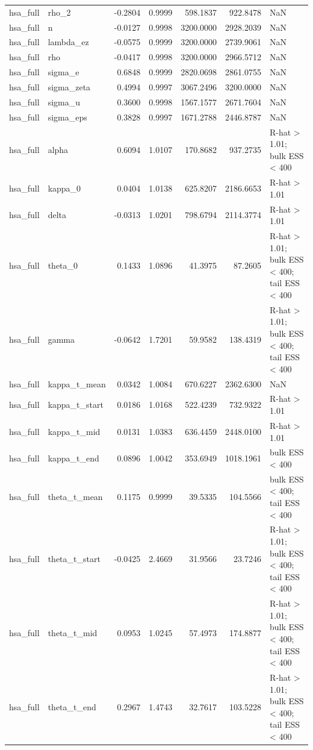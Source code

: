 \begin{tabular}{llrrrrl}
hsa\_full & rho\_2 & -0.2804 & 0.9999 & 598.1837 & 922.8478 & NaN \\
hsa\_full & n & -0.0127 & 0.9998 & 3200.0000 & 2928.2039 & NaN \\
hsa\_full & lambda\_ez & -0.0575 & 0.9999 & 3200.0000 & 2739.9061 & NaN \\
hsa\_full & rho & -0.0417 & 0.9998 & 3200.0000 & 2966.5712 & NaN \\
hsa\_full & sigma\_e & 0.6848 & 0.9999 & 2820.0698 & 2861.0755 & NaN \\
hsa\_full & sigma\_zeta & 0.4994 & 0.9997 & 3067.2496 & 3200.0000 & NaN \\
hsa\_full & sigma\_u & 0.3600 & 0.9998 & 1567.1577 & 2671.7604 & NaN \\
hsa\_full & sigma\_eps & 0.3828 & 0.9997 & 1671.2788 & 2446.8787 & NaN \\
hsa\_full & alpha & 0.6094 & 1.0107 & 170.8682 & 937.2735 & R-hat > 1.01; bulk ESS < 400 \\
hsa\_full & kappa\_0 & 0.0404 & 1.0138 & 625.8207 & 2186.6653 & R-hat > 1.01 \\
hsa\_full & delta & -0.0313 & 1.0201 & 798.6794 & 2114.3774 & R-hat > 1.01 \\
hsa\_full & theta\_0 & 0.1433 & 1.0896 & 41.3975 & 87.2605 & R-hat > 1.01; bulk ESS < 400; tail ESS < 400 \\
hsa\_full & gamma & -0.0642 & 1.7201 & 59.9582 & 138.4319 & R-hat > 1.01; bulk ESS < 400; tail ESS < 400 \\
hsa\_full & kappa\_t\_mean & 0.0342 & 1.0084 & 670.6227 & 2362.6300 & NaN \\
hsa\_full & kappa\_t\_start & 0.0186 & 1.0168 & 522.4239 & 732.9322 & R-hat > 1.01 \\
hsa\_full & kappa\_t\_mid & 0.0131 & 1.0383 & 636.4459 & 2448.0100 & R-hat > 1.01 \\
hsa\_full & kappa\_t\_end & 0.0896 & 1.0042 & 353.6949 & 1018.1961 & bulk ESS < 400 \\
hsa\_full & theta\_t\_mean & 0.1175 & 0.9999 & 39.5335 & 104.5566 & bulk ESS < 400; tail ESS < 400 \\
hsa\_full & theta\_t\_start & -0.0425 & 2.4669 & 31.9566 & 23.7246 & R-hat > 1.01; bulk ESS < 400; tail ESS < 400 \\
hsa\_full & theta\_t\_mid & 0.0953 & 1.0245 & 57.4973 & 174.8877 & R-hat > 1.01; bulk ESS < 400; tail ESS < 400 \\
hsa\_full & theta\_t\_end & 0.2967 & 1.4743 & 32.7617 & 103.5228 & R-hat > 1.01; bulk ESS < 400; tail ESS < 400 \\

\end{tabular}
